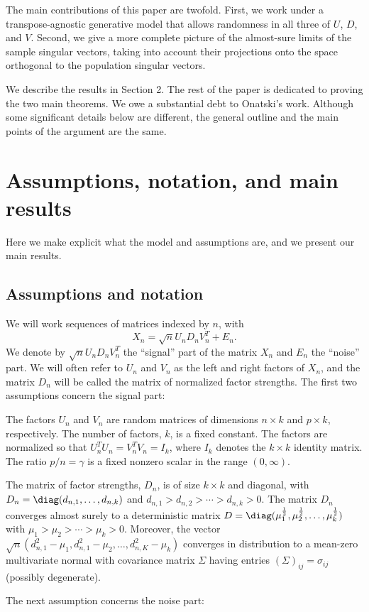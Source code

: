 The main contributions of this paper are twofold.  First, we work under a 
transpose-agnostic generative model that allows randomness in all three of
$U$, $D$, and $V$.  Second, we give a more complete picture of the almost-sure
limits of the sample singular vectors, taking into account their projections
onto the space orthogonal to the population singular vectors.  

We describe the results in Section 2. The rest of the paper is dedicated to
proving the two main theorems. We owe a substantial debt to Onatski's work.
Although some significant details below are different, the general outline and
the main points of the argument are the same.

\section{Assumptions, notation, and main results}

Here we make explicit what the model and assumptions are, and we present our
main results.

\subsection{Assumptions and notation}

We will work sequences of matrices indexed by $n$, with
\[
    X_n = \sqrt{n} U_n D_n V_n^T + E_n.
\]
We denote by $\sqrt{n} U_n D_n V_n^T$ the ``signal'' part of the matrix $X_n$
and $E_n$ the ``noise'' part.  We will often refer to $U_n$ and $V_n$ as the
left and right factors of $X_n$, and the matrix $D_n$ will be called the
matrix of normalized factor strengths.  The first two assumptions concern the
signal part:

\begin{assumption}\label{A:factors}
    The factors $U_n$ and $V_n$ are random matrices of dimensions
    $n \times k$ and $p \times k$, respectively.  The number of factors, $k$,
    is a fixed constant.  The factors are normalized so that
    $U_n^T U_n =  V_n^T V_n = I_k$, where $I_k$ denotes the
    $k \times k$ identity matrix.  The ratio $p/n = \gamma$ is a fixed nonzero
    scalar in the range $(0,\infty)$.
\end{assumption}
\noindent

\begin{assumption}\label{A:sizes}
    The matrix of factor strengths, $D_n$, is of size $k\times k$ and 
    diagonal, with $D_n = \diag(d_{n,1}, \ldots, d_{n,k})$ and
    $d_{n,1} > d_{n,2} > \cdots > d_{n,k} > 0$.  The matrix $D_n$ converges
    almost surely to a deterministic matrix 
    $D = \diag( \mu_1^\half, \mu_2^\half, \ldots, \mu_k^\half)$ with
    $\mu_1 > \mu_2 > \cdots > \mu_k > 0$. Moreover, the vector
    \(
        \sqrt{n} ( d_{n,1}^2 - \mu_1, d_{n,1}^2 - \mu_2, 
                   \ldots, 
                   d_{n,K}^2 - \mu_k )
    \)
    converges in distribution to a mean-zero multivariate normal with 
    covariance matrix $\Sigma$ having entries $(\Sigma)_{ij} = \sigma_{ij}$
    (possibly degenerate).
\end{assumption}
\noindent
The next assumption concerns the noise part:

